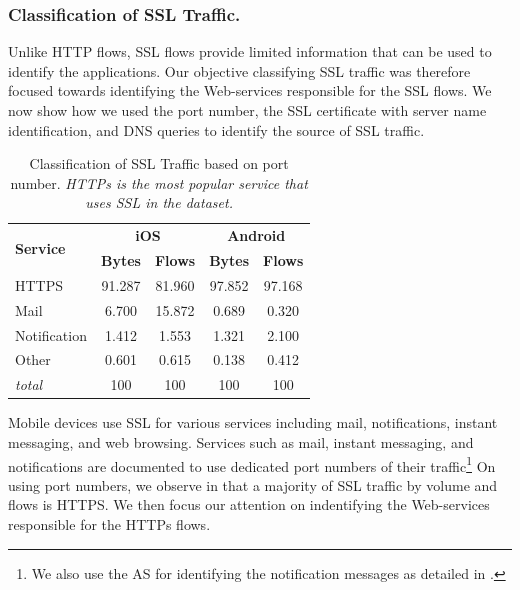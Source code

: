 \subsubsection{Classification of SSL Traffic.}

Unlike HTTP flows, SSL flows provide limited information that can be used to identify the applications. 
Our objective classifying SSL traffic was therefore focused towards identifying the Web-services responsible for the SSL flows. 
We now show how we used the port number, the SSL certificate with server name identification, and DNS queries to identify the source of SSL traffic. 

\begin{table}
\centering
\begin{small}
\begin{tabular}{|p{}|c|c|c|c|}
\hline
\multirow{2}{*}{\bf Service} & \multicolumn{2}{c|}{\bf iOS} &  \multicolumn{2}{c|}{\bf Android} \tabularnewline
\cline{2-5}
  & {\bf Bytes}  & {\bf Flows} & {\bf Bytes} & {\bf Flows} \tabularnewline
\hline
HTTPS                   & 91.287 & 81.960 & 97.852 & 97.168    \tabularnewline
\hline
Mail                    &  6.700 & 15.872 & 0.689  & 0.320  \tabularnewline
\hline
Notification            &  1.412 & 1.553  & 1.321  & 2.100  \tabularnewline
\hline
Other                   &  0.601 & 0.615  & 0.138  & 0.412 \tabularnewline
\hline
{\em total}             & 100 & 100 & 100 & 100 \tabularnewline
\hline
\end{tabular}
\end{small}
\caption{Classification of SSL Traffic based on port number. \emph{HTTPs is the most popular service that uses SSL in the \mobWild dataset.}}
\label{tab:classify-ssl-port}
\end{table}

Mobile devices use SSL for various services including mail, notifications, instant messaging, and web browsing.
Services such as mail, instant messaging, and notifications are documented to use dedicated port numbers of their traffic\footnote{We also use the AS for identifying the notification messages as detailed in .}
On using port numbers, we observe in  that a majority of SSL traffic by volume and flows is HTTPS.
We then focus our attention on indentifying the Web-services responsible for the HTTPs flows. 

